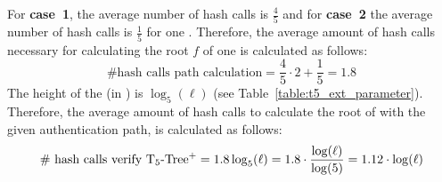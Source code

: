 For \textbf{case~1}, the average number of hash calls is $\frac{4}{5}$ and for \textbf{case~2} the average number of hash calls is $\frac{1}{5}$ for one \tfblock.
Therefore, the average amount of hash calls necessary for calculating the root $f$ of one \tfblock is calculated as follows:
\begin{equation}
\text{\# hash calls path calculation} = \frac{4}{5} \cdot 2 + \frac{1}{5} = 1.8
\end{equation}
The height of the \extree (in \tfblocks) is $\log_5(\ell)$ (see Table~\ref{table:t5_ext_parameter}). Therefore, the average amount of hash calls to calculate the root of \extree with the given authentication path, is calculated as follows:
\begin{equation}
\label{eq:ext_t5_hashcalls_verify}
\text{\# hash calls verify T$_5$-Tree$^+$} = 1.8\log_5(\ell) = 1.8 \cdot \frac{\log(\ell)}{\log(5)} = 1.12 \cdot \log(\ell)
\end{equation}